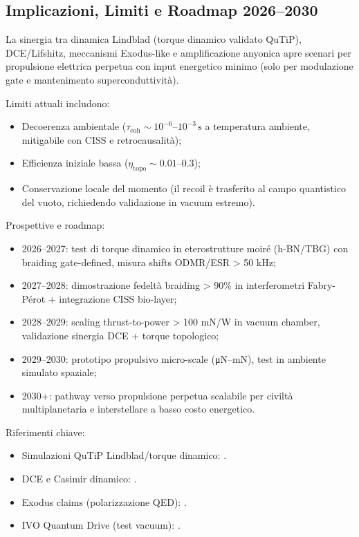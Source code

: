 \documentclass[11pt,a4paper]{article}
\let\oldcite\cite
\renewcommand{\cite}{\protect\oldcite}
\theoremstyle{plain}
\theoremstyle{definition}
\begin{document}
\subsection{Implicazioni, Limiti e Roadmap 2026–2030}

La sinergia tra dinamica Lindblad (torque dinamico validato QuTiP), DCE/Lifshitz, meccanismi Exodus-like e amplificazione anyonica apre scenari per propulsione elettrica perpetua con input energetico minimo (solo per modulazione gate e mantenimento superconduttività).  

Limiti attuali includono:
\begin{itemize}
    \item Decoerenza ambientale ($\tau_{\mathrm{coh}} \sim 10^{-6}$--$10^{-3}\,\mathrm{s}$ a temperatura ambiente, mitigabile con CISS e retrocausalità);
    \item Efficienza iniziale bassa ($\eta_{\mathrm{topo}} \sim 0.01$--$0.3$);
    \item Conservazione locale del momento (il recoil è trasferito al campo quantistico del vuoto, richiedendo validazione in vacuum estremo).
\end{itemize}

Prospettive e roadmap:
\begin{itemize}
    \item 2026–2027: test di torque dinamico in eterostrutture moiré (h-BN/TBG) con braiding gate-defined, misura shifts ODMR/ESR > 50 kHz;
    \item 2027–2028: dimostrazione fedeltà braiding > 90\% in interferometri Fabry-Pérot + integrazione CISS bio-layer;
    \item 2028–2029: scaling thrust-to-power > 100 mN/W in vacuum chamber, validazione sinergia DCE + torque topologico;
    \item 2029–2030: prototipo propulsivo micro-scale (μN–mN), test in ambiente simulato spaziale;
    \item 2030+: pathway verso propulsione perpetua scalabile per civiltà multiplanetaria e interstellare a basso costo energetico.
\end{itemize}

Riferimenti chiave:
\begin{itemize}
    \item Simulazioni QuTiP Lindblad/torque dinamico: \cite{PhysSoliman2026a, PhysSoliman2026b}.
    \item DCE e Casimir dinamico: \cite{Moore1970, Wilson2011, Lahteenmaki2013, Maclay2007}.
    \item Exodus claims (polarizzazione QED): \cite{BuhlerAPEC2025, BuhlerDebrief2024}.
    \item IVO Quantum Drive (test vacuum): \cite{IVO2026}.
\end{itemize}
\end{document}

